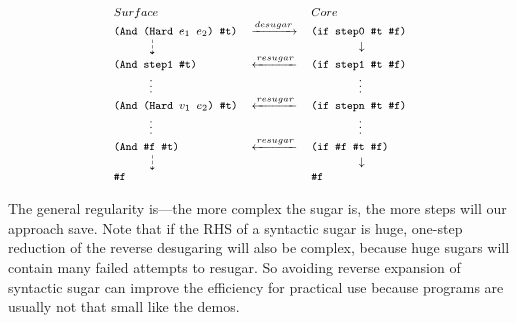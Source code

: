 \[
{\footnotesize
	\begin{array}{lcl}
	Surface&&Core\\
	\Code{(And (Hard $e_1$ $e_2$) \#t)}&\xrightarrow{desugar}&\Code{(if step0 \#t \#f)}\\
	\qquad\quad\dashdownarrow& &\qquad\qquad\downarrow\\
	\Code{(And step1 \#t)}&\xleftarrow{resugar}&\Code{(if step1 \#t \#f)}\\
	\qquad\quad\vdots& &\qquad\qquad\vdots\\
	\Code{(And (Hard $v_1$ $e_2$) \#t)}&\xleftarrow{resugar}&\Code{(if stepn \#t \#f)}\\
	\qquad\quad\vdots& &\qquad\qquad\vdots\\
	\Code{(And \#f \#t)}&\xleftarrow{resugar}& \Code{(if \#f \#t \#f)}\\
	\qquad\quad\dashdownarrow& &\qquad\qquad\downarrow\\
	\Code{\#f}&& \Code{\#f}\\
\end{array}
}
\]


The general regularity is---the more complex the sugar is, the more steps will our approach save. Note that if the RHS of a syntactic sugar is huge, one-step reduction of the reverse desugaring will also be complex, because huge sugars will contain many failed attempts to resugar. So avoiding reverse expansion of syntactic sugar can improve the efficiency for practical use because programs are usually not that small like the demos.
